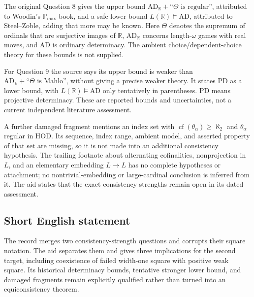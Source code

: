 \documentclass[11pt]{article}
\newcommand{\R}{\mathbb{R}}
\begin{document}
The original Question 8 gives the upper bound \(\mathrm{AD}_{\R}+\text{``}\Theta\text{ is regular''}\), attributed to Woodin's \(\mathbb P_{\max}\) book, and a safe lower bound \(L(\R)\models\mathrm{AD}\), attributed to Steel--Zoble, adding that more may be known. Here \(\Theta\) denotes the supremum of ordinals that are surjective images of \(\R\), \(\mathrm{AD}_{\R}\) concerns length-\(\omega\) games with real moves, and \(\mathrm{AD}\) is ordinary determinacy. The ambient choice/dependent-choice theory for these bounds is not supplied.

For Question 9 the source says its upper bound is weaker than \(\mathrm{AD}_{\R}+\text{``}\Theta\text{ is Mahlo''}\), without giving a precise weaker theory. It states PD as a lower bound, with \(L(\R)\models\mathrm{AD}\) only tentatively in parentheses. PD means projective determinacy. These are reported bounds and uncertainties, not a current independent literature assessment.

A further damaged fragment mentions an index set with \(\operatorname{cf}(\theta_\alpha)\ge\aleph_2\) and \(\theta_\alpha\) regular in HOD. Its sequence, index range, ambient model, and asserted property of that set are missing, so it is not made into an additional consistency hypothesis. The trailing footnote about alternating cofinalities, nonprojection in \(L\), and an elementary embedding \(L\to L\) has no complete hypotheses or attachment; no nontrivial-embedding or large-cardinal conclusion is inferred from it. The aid states that the exact consistency strengths remain open in its dated assessment.
\subsection{Short English statement}
The record merges two consistency-strength questions and corrupts their square notation. The aid separates them and gives three implications for the second target, including coexistence of failed width-one square with positive weak square. Its historical determinacy bounds, tentative stronger lower bound, and damaged fragments remain explicitly qualified rather than turned into an equiconsistency theorem.
\end{document}
